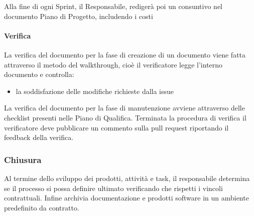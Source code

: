         Alla fine di ogni Sprint, il Responsabile, redigerà poi un consuntivo nel documento Piano di Progetto, includendo i costi 

        \paragraph{Verifica} \label{sec:pian-verifica}

        La verifica del documento per la fase di creazione di un documento viene fatta attraverso il metodo del walkthrough, cioè il verificatore legge l’interno documento e controlla:
        \begin{itemize}
            \item la soddisfazione delle modifiche richieste dalla issue
        \end{itemize}

La verifica del documento per la fase di manutenzione avviene attraverso delle checklist presenti nelle Piano di Qualifica. Terminata la procedura di verifica il verificatore deve pubblicare un commento sulla pull request riportando il feedback della verifica.





    \subsubsection{Chiusura}\label{sec:closure}
        Al termine dello sviluppo dei prodotti, attivit\`a e task, il responsabile determina se il processo si possa definire ultimato verificando che rispetti i vincoli contrattuali. Infine archivia documentazione e prodotti software in un ambiente predefinito da contratto.
        
        